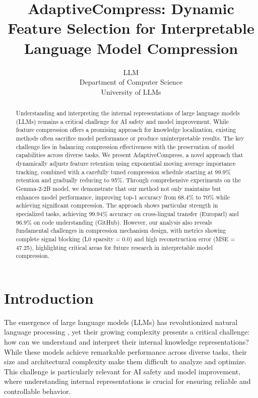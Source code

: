 \documentclass{article} %
\title{AdaptiveCompress: Dynamic Feature Selection for Interpretable Language Model Compression}
\author{LLM\\
Department of Computer Science\\
University of LLMs\\
}
\begin{document}
\maketitle

\begin{abstract}
Understanding and interpreting the internal representations of large language models (LLMs) remains a critical challenge for AI safety and model improvement. While feature compression offers a promising approach for knowledge localization, existing methods often sacrifice model performance or produce uninterpretable results. The key challenge lies in balancing compression effectiveness with the preservation of model capabilities across diverse tasks. We present AdaptiveCompress, a novel approach that dynamically adjusts feature retention using exponential moving average importance tracking, combined with a carefully tuned compression schedule starting at 99.9\% retention and gradually reducing to 95\%. Through comprehensive experiments on the Gemma-2-2B model, we demonstrate that our method not only maintains but enhances model performance, improving top-1 accuracy from 68.4\% to 70\% while achieving significant compression. The approach shows particular strength in specialized tasks, achieving 99.94\% accuracy on cross-lingual transfer (Europarl) and 96.9\% on code understanding (GitHub). However, our analysis also reveals fundamental challenges in compression mechanism design, with metrics showing complete signal blocking (L0 sparsity = 0.0) and high reconstruction error (MSE = 47.25), highlighting critical areas for future research in interpretable model compression.
\end{abstract}

\section{Introduction}
\label{sec:intro}

The emergence of large language models (LLMs) has revolutionized natural language processing \cite{gpt4}, yet their growing complexity presents a critical challenge: how can we understand and interpret their internal knowledge representations? While these models achieve remarkable performance across diverse tasks, their size and architectural complexity make them difficult to analyze and optimize. This challenge is particularly relevant for AI safety and model improvement, where understanding internal representations is crucial for ensuring reliable and controllable behavior.
\end{document}
